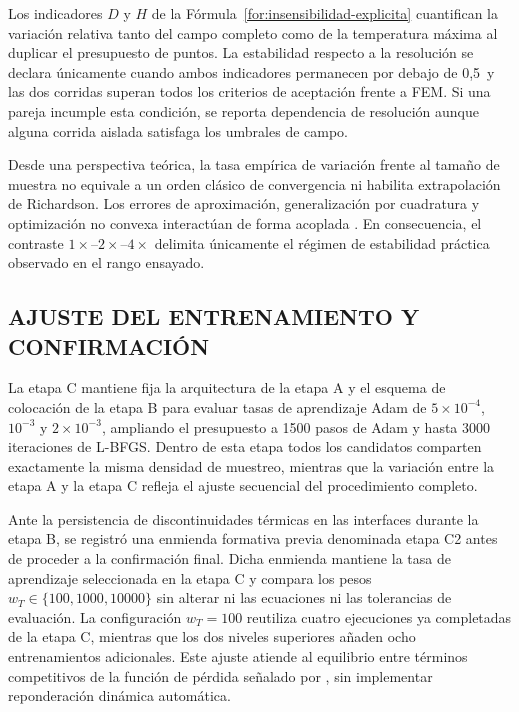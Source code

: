 Los indicadores $D$ y $H$ de la Fórmula~\ref{for:insensibilidad-explicita} cuantifican la variación relativa tanto del campo completo como de la temperatura máxima al duplicar el presupuesto de puntos. La estabilidad respecto a la resolución se declara únicamente cuando ambos indicadores permanecen por debajo de 0,5\,\pct{} y las dos corridas superan todos los criterios de aceptación frente a FEM. Si una pareja incumple esta condición, se reporta dependencia de resolución aunque alguna corrida aislada satisfaga los umbrales de campo.

Desde una perspectiva teórica, la tasa empírica de variación frente al tamaño de muestra no equivale a un orden clásico de convergencia ni habilita extrapolación de Richardson. Los errores de aproximación, generalización por cuadratura y optimización no convexa interactúan de forma acoplada \parencites{deryck2024analysis}{mishra2020error}. En consecuencia, el contraste $1\times$--$2\times$--$4\times$ delimita únicamente el régimen de estabilidad práctica observado en el rango ensayado.

\subsection{AJUSTE DEL ENTRENAMIENTO Y CONFIRMACIÓN}

La etapa C mantiene fija la arquitectura de la etapa A y el esquema de colocación de la etapa B para evaluar tasas de aprendizaje Adam de $5\times10^{-4}$, $10^{-3}$ y $2\times10^{-3}$, ampliando el presupuesto a 1500 pasos de Adam y hasta 3000 iteraciones de L-BFGS. Dentro de esta etapa todos los candidatos comparten exactamente la misma densidad de muestreo, mientras que la variación entre la etapa A y la etapa C refleja el ajuste secuencial del procedimiento completo.

Ante la persistencia de discontinuidades térmicas en las interfaces durante la etapa B, se registró una enmienda formativa previa denominada etapa C2 antes de proceder a la confirmación final. Dicha enmienda mantiene la tasa de aprendizaje seleccionada en la etapa C y compara los pesos $w_T\in\{100, 1000, 10000\}$ sin alterar ni las ecuaciones ni las tolerancias de evaluación. La configuración $w_T=100$ reutiliza cuatro ejecuciones ya completadas de la etapa C, mientras que los dos niveles superiores añaden ocho entrenamientos adicionales. Este ajuste atiende al equilibrio entre términos competitivos de la función de pérdida señalado por \textcite{wang2020gradients}, sin implementar reponderación dinámica automática.

